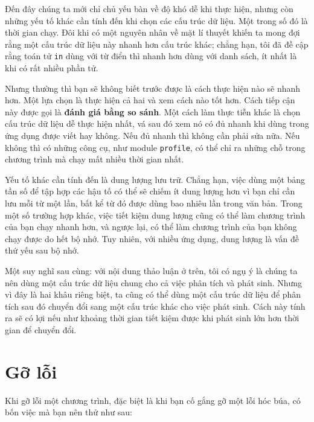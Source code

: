 \documentclass[11pt]{book}
\begin{document}
Đến đây chúng ta mới chỉ chủ yếu bàn về độ khó dễ khi thực hiện,
nhưng còn những yếu tố khác cần tính đến khi chọn các cấu trúc
dữ liệu. Một trong số đó là thời gian chạy. Đôi khi có một nguyên
nhân về mặt lí thuyết khiến ta mong đợi rằng một cấu trúc dữ liệu
này nhanh hơn cấu trúc khác; chẳng hạn, tôi đã đề cập rằng toán
tử {\tt in} dùng với từ điển thì nhanh hơn dùng với danh sách,
ít nhất là khi có rất nhiều phần tử.

Nhưng thường thì bạn sẽ không biết trước được là cách thực hiện
nào sẽ nhanh hơn. Một lựa chọn là thực hiện cả hai và xem cách
nào tốt hơn. Cách tiếp cận này được gọi là {\bf đánh giá bằng so sánh}.
Một cách làm thực tiễn khác là chọn cấu trúc dữ liệu dễ thực hiện
nhất, vá sau đó xem nó có đủ nhanh khi dùng trong ứng dụng 
được viết hay không. Nếu đủ nhanh thì không cần phải sửa nữa.
Nếu không thì có những công cụ, như module {\tt profile}, có thể
chỉ ra những chỗ trong chương trình mà chạy mất nhiều thời gian nhất.


Yếu tố khác cần tính đến là dung lượng lưu trữ. Chẳng hạn, việc dùng
một bảng tần số để tập hợp các hậu tố có thể sẽ chiếm ít dung lượng
hơn vì bạn chỉ cần lưu mỗi từ một lần, bất kể từ đó được dùng bao nhiêu
lần trong văn bản. Trong một số trường hợp khác, việc tiết kiệm dung lượng
cũng có thể làm chương trình của bạn chạy nhanh hơn, và ngược lại,
có thể làm chương trình của bạn không chạy được do hết bộ nhớ.
Tuy nhiên, với nhiều ứng dụng, dung lượng là vấn đề thứ yếu sau bộ nhớ.

Một suy nghĩ sau cùng: với nội dung thảo luận ở trên, tôi có ngụ ý là
chúng ta nên dùng một cấu trúc dữ liệu chung cho cả việc phân tích
và phát sinh. Nhưng vì đây là hai khâu riêng biệt, ta cũng có thể dùng
một cấu trúc dữ liệu để phân tích sau đó chuyển đổi sang một cấu trúc
khác cho việc phát sinh. Cách này tính ra sẽ có lợi nếu như khoảng thời gian 
tiết kiệm được khi phát sinh lớn hơn thời gian để chuyển đổi.


\section{Gỡ lỗi}

Khi gỡ lỗi một chương trình, đặc biệt là khi bạn cố gắng gỡ một lỗi
hóc búa, có bốn việc mà bạn nên thử như sau:
\end{document}
